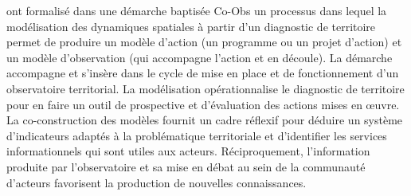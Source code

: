\citet{lemoisson_cadre_2012} ont formalisé dans une démarche baptisée Co-Obs 
un processus dans lequel la modélisation des dynamiques spatiales à partir d'un diagnostic
de territoire permet de produire un modèle d'action (un programme ou un projet d'action)
et un modèle d'observation (qui accompagne l'action et en découle).
La démarche accompagne et s'insère dans le cycle de mise en place et de fonctionnement d'un observatoire territorial.
La modélisation opérationnalise le diagnostic de territoire pour en faire un outil de prospective
et d'évaluation des actions mises en œuvre.
La co-construction des modèles fournit un cadre réflexif pour déduire un système d'indicateurs adaptés à la problématique
territoriale et d'identifier les services informationnels qui sont utiles aux acteurs.
Réciproquement, l’information produite par l’observatoire et sa mise en débat au sein de la communauté 
d’acteurs favorisent la production de nouvelles connaissances.

